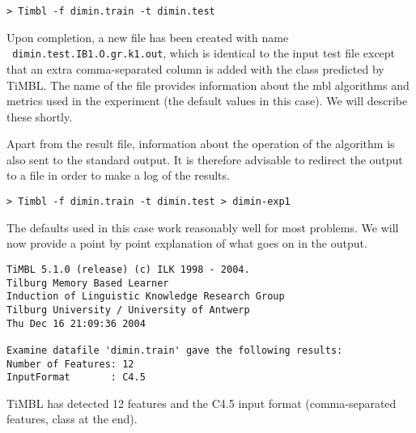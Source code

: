 \documentclass{report}
\begin{document}
{\footnotesize
\begin{verbatim}
> Timbl -f dimin.train -t dimin.test
\end{verbatim}
}

Upon completion, a new file has been created with name\\ {\small\tt
dimin.test.IB1.O.gr.k1.out}, which is identical to the
input test file except that an extra comma-separated column is added
with the class predicted by TiMBL. The name of the file provides
information about the {\sc mbl} algorithms and metrics used in the
experiment (the default values in this case). We will describe these
shortly.

Apart from the result file, information about the operation of the
algorithm is also sent to the standard output. It is therefore 
advisable to redirect the output to a file in order to make a log of
the results.

{\footnotesize
\begin{verbatim}
> Timbl -f dimin.train -t dimin.test > dimin-exp1
\end{verbatim}
}

The defaults used in this case work reasonably well for most problems.  We
will now provide a point by point explanation of what goes on in the
output.



{\footnotesize
\begin{verbatim}
TiMBL 5.1.0 (release) (c) ILK 1998 - 2004.
Tilburg Memory Based Learner
Induction of Linguistic Knowledge Research Group
Tilburg University / University of Antwerp
Thu Dec 16 21:09:36 2004

Examine datafile 'dimin.train' gave the following results:
Number of Features: 12
InputFormat       : C4.5
\end{verbatim}
}



TiMBL has detected 12 features and the C4.5 input format
(comma-separated features, class at the end).

\end{document}
